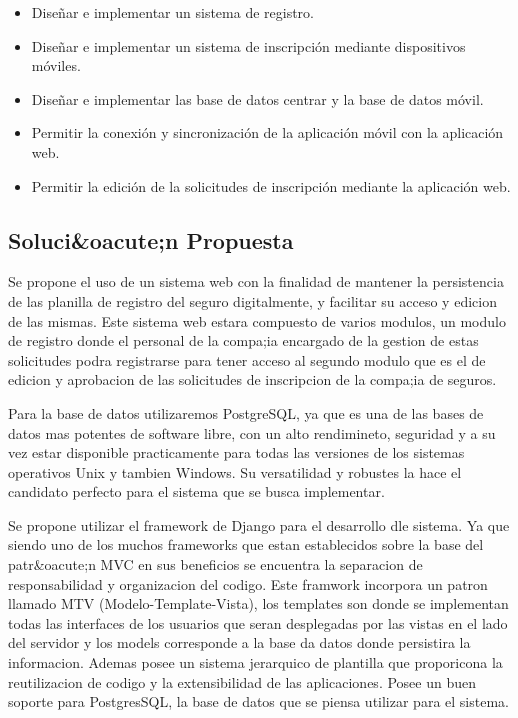 \begin{itemize}

	\item Diseñar e implementar un sistema de registro.
	
	\item Diseñar e implementar un sistema de inscripción mediante dispositivos móviles.
	
	\item Diseñar e implementar las base de datos centrar y la base de datos móvil.
	
	\item Permitir la conexión y sincronización de la aplicación móvil con la aplicación web.
	
	\item Permitir la edición de la solicitudes de inscripción mediante la aplicación web.
	
	

\end{itemize}



\subsection{Soluci&oacute;n Propuesta}

Se propone el uso de un sistema web con la finalidad de mantener la persistencia de las planilla de registro del seguro digitalmente, y facilitar su acceso y edicion de las mismas. Este sistema web estara compuesto de varios modulos, un modulo de registro donde el personal de la compa;ia encargado de la gestion de estas solicitudes podra registrarse para tener acceso al segundo modulo que es el de edicion y aprobacion de las solicitudes de inscripcion de la compa;ia de seguros.



Para la base de datos utilizaremos PostgreSQL, ya que es una de las bases de datos mas potentes de software libre, con un alto rendimineto, seguridad y a su vez estar disponible practicamente para todas las versiones de los sistemas operativos Unix y tambien Windows. Su versatilidad y robustes la hace el candidato perfecto para el sistema que se busca implementar.

Se propone utilizar el framework de Django para el desarrollo dle sistema. Ya que siendo uno de los muchos frameworks que estan establecidos sobre la base del patr&oacute;n MVC en sus beneficios se encuentra la separacion de responsabilidad y organizacion del codigo. Este framwork incorpora un patron llamado MTV (Modelo-Template-Vista), los templates son donde se implementan todas las interfaces de los usuarios que seran desplegadas por las vistas en el lado del servidor y los models corresponde a la base da datos donde persistira la informacion. Ademas posee un sistema jerarquico de plantilla que proporicona la reutilizacion de codigo y la extensibilidad de las aplicaciones. Posee un buen soporte para PostgresSQL, la base de datos que se piensa utilizar para el sistema. 


